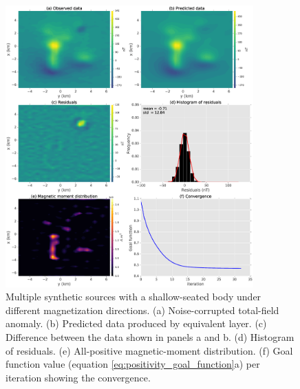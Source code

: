 \begin{figure}
	\centering
	\includegraphics[width=0.85\textwidth]{Fig/unidir_shallow_diff_test/figure4.eps}
	\caption{Multiple synthetic sources with a shallow-seated body under different magnetization directions. (a) Noise-corrupted total-field anomaly. (b) Predicted data produced by equivalent layer. (c) Difference between the data shown in panels a and b. (d) Histogram of residuals. (e) All-positive magnetic-moment distribution. (f) Goal function value (equation \ref{eq:positivity_goal_function}a) per iteration showing the convergence.}
	\label{fig:unidir_shallow_diff_test}
\end{figure}

